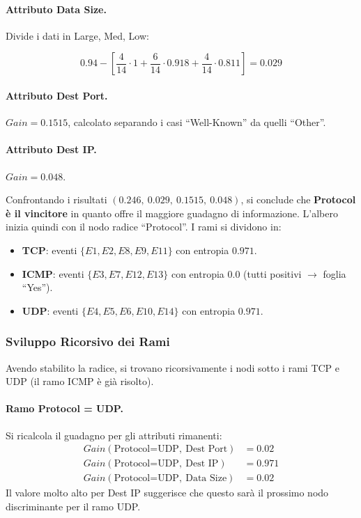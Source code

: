 \paragraph{Attributo Data Size.}
Divide i dati in Large, Med, Low:

\begin{equation}
    0.94 -
    \left[\frac{4}{14}\cdot 1
    + \frac{6}{14}\cdot 0.918
    + \frac{4}{14}\cdot 0.811\right]
    = 0.029
\end{equation}

\paragraph{Attributo Dest Port.}
$Gain = 0.1515$, calcolato separando
i casi ``Well-Known'' da quelli ``Other''.

\paragraph{Attributo Dest IP.}
$Gain = 0.048$.

Confrontando i risultati $(0.246,\ 0.029,\ 0.1515,\ 0.048)$,
si conclude che \textbf{Protocol è il vincitore} in quanto
offre il maggiore guadagno di informazione. L'albero inizia
quindi con il nodo radice ``Protocol''. I rami si dividono
in:

\begin{itemize}
    \item \textbf{TCP}: eventi $\{E1, E2, E8, E9, E11\}$
        con entropia $0.971$.
    \item \textbf{ICMP}: eventi $\{E3, E7, E12, E13\}$
        con entropia $0.0$ (tutti positivi
        $\rightarrow$ foglia ``Yes'').
    \item \textbf{UDP}: eventi $\{E4, E5, E6, E10, E14\}$
        con entropia $0.971$.
\end{itemize}

\subsubsection{Sviluppo Ricorsivo dei Rami}

Avendo stabilito la radice, si trovano ricorsivamente i
nodi sotto i rami TCP e UDP (il ramo ICMP è già risolto).

\paragraph{Ramo Protocol = UDP.}
Si ricalcola il guadagno per gli attributi rimanenti:
\begin{align*}
    Gain(\text{Protocol=UDP},\ \text{Dest Port})
        &= 0.02 \\
    Gain(\text{Protocol=UDP},\ \text{Dest IP})
        &= 0.971 \\
    Gain(\text{Protocol=UDP},\ \text{Data Size})
        &= 0.02 
\end{align*}
Il valore molto alto per Dest IP suggerisce che questo
sarà il prossimo nodo discriminante per il ramo UDP.


